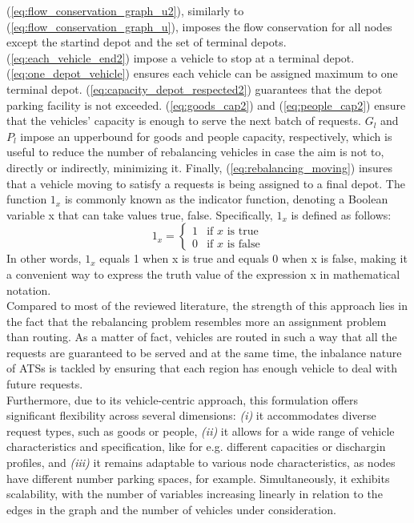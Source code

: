 (\ref{eq:flow_conservation_graph_u2}), similarly to (\ref{eq:flow_conservation_graph_u}), imposes the flow conservation for all nodes except the startind depot and the set of terminal depots. (\ref{eq:each_vehicle_end2}) impose a vehicle to stop at a terminal depot.  (\ref{eq:one_depot_vehicle}) ensures each vehicle can be assigned maximum to one terminal depot. (\ref{eq:capacity_depot_respected2}) guarantees that the depot parking facility is not exceeded. (\ref{eq:goods_cap2}) and (\ref{eq:people_cap2}) ensure that the vehicles' capacity is enough to serve the next batch of requests. $G_{l}$ and $P_l$ impose an upperbound for goods and people capacity, respectively, which is useful to reduce the number of rebalancing vehicles in case the aim is not to, directly or indirectly, minimizing it. Finally, (\ref{eq:rebalancing_moving}) insures that a vehicle moving to satisfy a requests is being assigned to a final depot. The function $1_x$ is commonly known as the indicator function, denoting a Boolean variable x that can take values {true, false}. Specifically, $1_x$ is defined as follows:
\begin{equation}
	1_x = \begin{cases}
		1 & \text{if } x \text{ is true} \\
		0 & \text{if } x \text{ is false}
	\end{cases}
\end{equation}
In other words, $1_x$ equals 1 when x is true and equals 0 when x is false, making it a convenient way to express the truth value of the expression x in mathematical notation.\\
Compared to most of the reviewed literature, the strength of this approach lies in the fact that the rebalancing problem resembles more an assignment problem than routing. As a matter of fact, vehicles are routed in such a way that all the requests are guaranteed to be served and at the same time, the inbalance nature of ATSs is tackled by ensuring that each region has enough vehicle to deal with future requests. \\
Furthermore, due to its vehicle-centric approach, this formulation offers significant flexibility across several dimensions: \textit{(i)} it accommodates diverse request types, such as goods or people, \textit{(ii)} it allows for a wide range of vehicle characteristics and specification, like for e.g. different capacities or dischargin profiles, and \textit{(iii)} it remains adaptable to various node characteristics, as nodes have different number parking spaces, for example. Simultaneously, it exhibits scalability, with the number of variables increasing linearly in relation to the edges in the graph and the number of vehicles under consideration.\\
